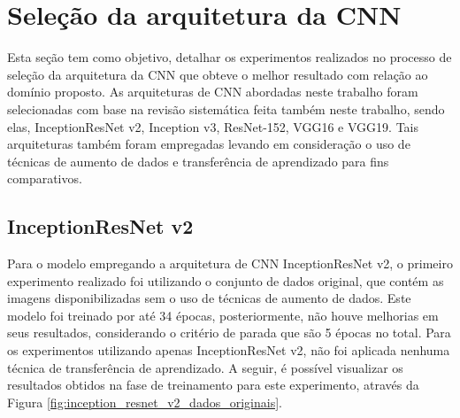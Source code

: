 \documentclass[
	12pt,				%
	oneside,			%
	a4paper,			%
	english,			%
	brazil				%
	]{abntex2ppgsi}
\begin{document}
\section{Seleção da arquitetura da CNN}
Esta seção tem como objetivo, detalhar os experimentos realizados no processo de seleção da arquitetura da CNN que obteve o melhor resultado com relação ao domínio proposto. As arquiteturas de CNN abordadas neste trabalho foram selecionadas com base na revisão sistemática feita também neste trabalho, sendo elas, InceptionResNet v2, Inception v3, ResNet-152, VGG16 e VGG19. Tais arquiteturas também foram empregadas levando em consideração o uso de técnicas de aumento de dados e transferência de aprendizado para fins comparativos.

\subsection{InceptionResNet v2}
Para o modelo empregando a arquitetura de CNN InceptionResNet v2, o primeiro experimento realizado foi utilizando o conjunto de dados original, que contém as imagens disponibilizadas sem o uso de técnicas de aumento de dados. Este modelo foi treinado por até 34 épocas, posteriormente, não houve melhorias em seus resultados, considerando o critério de parada que são 5 épocas no total. Para os experimentos utilizando apenas InceptionResNet v2, não foi aplicada nenhuma técnica de transferência de aprendizado. A seguir, é possível visualizar os resultados obtidos na fase de treinamento para este experimento, através da Figura \ref{fig:inception_resnet_v2_dados_originais}.
\end{document}
